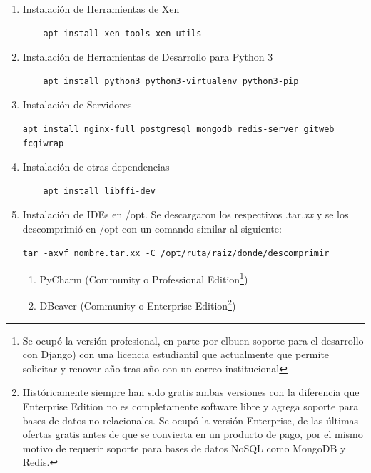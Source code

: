 \begin{enumerate}
\begin{lstlisting}[breaklines=true]
	auto xenbr0
	iface xenbr0 inet static
		address 10.10.10.1
		netmask 255.255.255.0
		bridge_ports wlan0

	#other possibly useful options in a
	#	virtualized environment
		#bridge_stp off		# disable
		#		Spanning Tree Protocol
		#bridge_waitport 0	# no delay
		#		before a port becomes
		#		available
		#bridge_fd 0		# no forwarding
		#		delay

	## configure a (separate) bridge for
	#	the DomUs without giving Dom0 an
	#	IP on it
	#auto xenbr1
	#iface xenbr1 inet manual
	#   bridge_ports eth1

	EOF

	reboot
		\end{lstlisting}
	\item Instalación de Herramientas de Xen
		\begin{lstlisting}
	apt install xen-tools xen-utils
		\end{lstlisting}
    \item Instalación de Herramientas de Desarrollo para Python 3
    	\begin{lstlisting}
	apt install python3 python3-virtualenv python3-pip
    	\end{lstlisting}
    \item Instalación de Servidores
    	\begin{lstlisting}[breaklines=true]
	apt install nginx-full postgresql mongodb redis-server gitweb fcgiwrap
    	\end{lstlisting}
    \item Instalación de otras dependencias
    	\begin{lstlisting}
	apt install libffi-dev
    	\end{lstlisting}
    \item Instalación de IDEs en /opt. Se descargaron los respectivos .tar\textit{.xx} y se los descomprimió en /opt con un comando similar al siguiente:
    	\begin{lstlisting}[breaklines=true]
	tar -axvf nombre.tar.xx -C /opt/ruta/raiz/donde/descomprimir
    	\end{lstlisting}
    \begin{enumerate}
    	\item PyCharm (Community o Professional Edition\footnote{Se ocupó la versión profesional, en parte por elbuen soporte para el desarrollo con Django) con una licencia estudiantil que actualmente que permite solicitar y renovar año tras año con un correo institucional})
        \item DBeaver (Community o Enterprise Edition\footnote{Históricamente siempre han sido gratis ambas versiones con la diferencia que Enterprise Edition no es completamente software libre y agrega soporte para bases de datos no relacionales. Se ocupó la versión Enterprise, de las últimas ofertas gratis antes de que se convierta en un producto de pago, por el mismo motivo de requerir soporte para bases de datos NoSQL como MongoDB y Redis.})
    \end{enumerate}
\end{enumerate}

